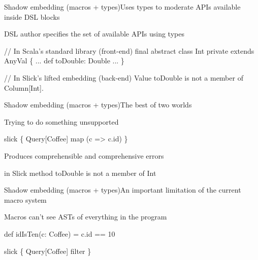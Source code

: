 \documentclass{beamer}
\begin{document}
\begin{frame}[fragile]{Shadow embedding (macros + types)}{Uses types to moderate APIs available inside DSL blocks}
  \vspace{1em}
  \begin{exampleblock}{DSL author specifies the set of available APIs using types}
  \begin{semiverbatim}
// In Scala's standard library (front-end)
final abstract class Int private extends AnyVal \{
  ...
  def toDouble: Double
  ...
\}

// In Slick's lifted embedding (back-end)
Value toDouble is not a member of Column[Int].
  \end{semiverbatim}
  \end{exampleblock}
\end{frame}

\begin{frame}[fragile]{Shadow embedding (macros + types)}{The best of two worlds}
  \vspace{1em}
  \begin{exampleblock}{Trying to do something unsupported}
  \begin{semiverbatim}
slick \{
  Query[Coffee] map
    (c => c.id\text{\color{blue}{.toDouble}})
\}\end{semiverbatim}
  \end{exampleblock}

  \vspace{1em}
  \begin{exampleblock}{Produces comprehensible and comprehensive errors}
  \begin{semiverbatim}
in Slick method toDouble is not a member of Int
  \end{semiverbatim}
  \end{exampleblock}
\end{frame}

\begin{frame}[fragile]{Shadow embedding (macros + types)}{An important limitation of the current macro system}
  \vspace{1em}
  \begin{alertblock}{Macros can't see ASTs of everything in the program}
  \begin{semiverbatim}
def idIsTen(c: Coffee) = c.id == 10

slick \{
  Query[Coffee] filter \text{\color{blue}{idIsTen}}
\}
  \end{semiverbatim}
  \end{alertblock}
\end{frame}
\end{document}
